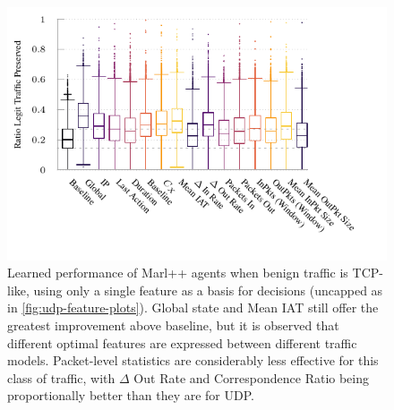 \documentclass[conference, letterpaper, 10pt, times]{IEEEtran}
\begin{document}
\begin{figure}
	\centering
	\includegraphics[width=\linewidth]{../plots/ftprep-tcp-box}
	\vspace{-1.2cm}
	\caption{
		Learned performance of Marl++ agents when benign traffic is TCP-like, using only a single feature as a basis for decisions (uncapped as in \cref{fig:udp-feature-plots}).
		Global state and Mean IAT still offer the greatest improvement above baseline, but it is observed that different optimal features are expressed between different traffic models.
		Packet-level statistics are considerably less effective for this class of traffic, with $\Delta$ Out Rate and Correspondence Ratio being proportionally better than they are for UDP.
		\label{fig:tcp-feature-plots}
	}
\end{figure}
\end{document}
